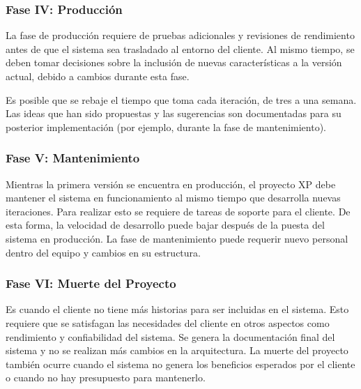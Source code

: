 \setlength{\parskip}{0mm}

\subsubsection{Fase IV: Producción}
\setlength{\parskip}{5mm}

	La fase de producción requiere de pruebas adicionales y revisiones de rendimiento antes de que el sistema sea trasladado al entorno del cliente. Al mismo tiempo, se deben tomar decisiones sobre la inclusión de nuevas características a la versión actual, debido a cambios durante esta fase.

	Es posible que se rebaje el tiempo que toma cada iteración, de tres a una semana. Las ideas que han sido propuestas y las sugerencias son documentadas para su posterior implementación (por ejemplo, durante la fase de mantenimiento).

\setlength{\parskip}{0mm}

\subsubsection{Fase V: Mantenimiento}
\setlength{\parskip}{5mm}

	Mientras la primera versión se encuentra en producción, el proyecto XP debe mantener el sistema en funcionamiento al mismo tiempo que desarrolla nuevas iteraciones. Para realizar esto se requiere de tareas de soporte para el cliente. De esta forma, la velocidad de desarrollo puede bajar después de la puesta del sistema en producción. La fase de mantenimiento puede requerir nuevo personal dentro del equipo y cambios en su estructura.

\setlength{\parskip}{0mm}

\subsubsection{Fase VI: Muerte del Proyecto}
\setlength{\parskip}{5mm}

	Es cuando el cliente no tiene más historias para ser incluidas en el sistema. Esto requiere que se satisfagan las necesidades del cliente en otros aspectos como rendimiento y confiabilidad del sistema. Se genera la documentación final del sistema y no se realizan más cambios en la arquitectura. La muerte del proyecto también ocurre cuando el sistema no genera los beneficios esperados por el cliente o cuando no hay presupuesto para mantenerlo.

\setlength{\parskip}{0mm}

